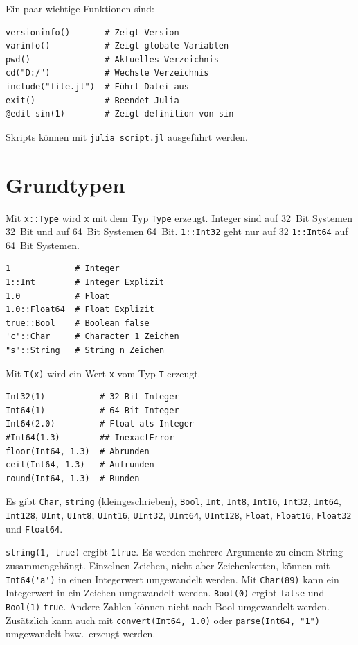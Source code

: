 \documentclass[10pt,twocolumn]{scrartcl}
\begin{document}
Ein paar wichtige Funktionen sind:

\begin{lstlisting}
versioninfo()       # Zeigt Version
varinfo()           # Zeigt globale Variablen
pwd()               # Aktuelles Verzeichnis
cd("D:/")           # Wechsle Verzeichnis
include("file.jl")  # Führt Datei aus
exit()              # Beendet Julia
@edit sin(1)        # Zeigt definition von sin
\end{lstlisting}

Skripts können mit \lstinline|julia script.jl| ausgeführt werden.

\section{Grundtypen}
\label{sec:grundtypen}

Mit \lstinline|x::Type| wird \lstinline|x| mit dem Typ \lstinline|Type| erzeugt.
Integer sind auf 32~Bit Systemen 32~Bit und auf 64~Bit Systemen 64~Bit.
\lstinline|1::Int32| geht nur auf 32 \lstinline|1::Int64| auf 64~Bit Systemen. 

\begin{lstlisting}
1             # Integer
1::Int        # Integer Explizit
1.0           # Float
1.0::Float64  # Float Explizit
true::Bool    # Boolean false
'c'::Char     # Character 1 Zeichen
"s"::String   # String n Zeichen
\end{lstlisting}

Mit \lstinline|T(x)| wird ein Wert \lstinline|x| vom Typ \lstinline|T| erzeugt.

\begin{lstlisting}
Int32(1)           # 32 Bit Integer
Int64(1)           # 64 Bit Integer
Int64(2.0)         # Float als Integer
#Int64(1.3)        ## InexactError
floor(Int64, 1.3)  # Abrunden
ceil(Int64, 1.3)   # Aufrunden
round(Int64, 1.3)  # Runden
\end{lstlisting}

Es gibt
\lstinline|Char|,
\lstinline|string| (kleingeschrieben),
\lstinline|Bool|,
\lstinline|Int|,
 \lstinline|Int8|,
\lstinline|Int16|,
\lstinline|Int32|,
\lstinline|Int64|,
\lstinline|Int128|,
\lstinline|UInt|,
\lstinline|UInt8|,
\lstinline|UInt16|,
\lstinline|UInt32|,
\lstinline|UInt64|,
\lstinline|UInt128|,
\lstinline|Float|,
\lstinline|Float16|,
\lstinline|Float32| und
\lstinline|Float64|.

\lstinline|string(1, true)| ergibt \lstinline|1true|. Es werden mehrere
Argumente zu einem String zusammengehängt. Einzelnen Zeichen, nicht aber
Zeichenketten, können mit \lstinline|Int64('a')| in einen Integerwert
umgewandelt werden. Mit \lstinline|Char(89)| kann ein Integerwert in ein Zeichen
umgewandelt werden. \lstinline|Bool(0)| ergibt \lstinline|false| und
\lstinline|Bool(1)| \lstinline|true|. Andere Zahlen können nicht nach Bool
umgewandelt werden. Zusätzlich kann auch mit \lstinline|convert(Int64, 1.0)|
oder \lstinline|parse(Int64, "1")| umgewandelt bzw.\ erzeugt werden.
\end{document}

